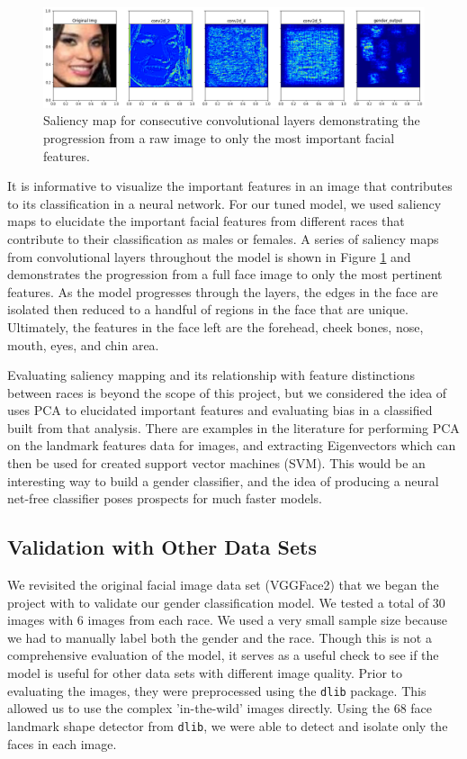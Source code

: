 \documentclass[obeyspaces, spaces, fleqn,10pt]{SelfArx} %
\begin{document}
\begin{figure}[ht]\centering %
\includegraphics[width=.95\linewidth]{img/saliency}
\caption{Saliency map for consecutive convolutional layers demonstrating the progression from a raw image to only the most important facial features.}
\label{fig:fig7}
\end{figure}

It is informative to visualize the important features in an image that contributes to its classification in a neural network. For our tuned model, we used saliency maps to elucidate the important facial features from different races that contribute to their classification as males or females. A series of saliency maps from convolutional layers throughout the model is shown in Figure \ref{fig:fig7} and demonstrates the progression from a full face image to only the most pertinent features. As the model progresses through the layers, the edges in the face are isolated then reduced to a handful of regions in the face that are unique. Ultimately, the features in the face left are the forehead, cheek bones, nose, mouth, eyes, and chin area. 


Evaluating saliency mapping and its relationship with feature distinctions between races is beyond the scope of this project, but we considered the idea of uses PCA to elucidated important features and evaluating bias in a classified built from that analysis. There are examples in the literature for performing PCA on the landmark features data for images, and extracting Eigenvectors which can then be used for created support vector machines (SVM). This would be an interesting way to build a gender classifier, and the idea of producing a neural net-free classifier poses prospects for much faster models. 

\subsection{Validation with Other Data Sets}
We revisited the original facial image data set (VGGFace2) that we began the project with to validate our gender classification model. We tested a total of 30 images with 6 images from each race. We used a very small sample size because we had to manually label both the gender and the race. Though this is not a comprehensive evaluation of the model, it serves as a useful check to see if the model is useful for other data sets with different image quality. Prior to evaluating the images, they were preprocessed using the \texttt{dlib} package. This allowed us to use the complex 'in-the-wild' images directly. Using the 68 face landmark shape detector from \texttt{dlib}, we were able to detect and isolate only the faces in each image.
\end{document}
